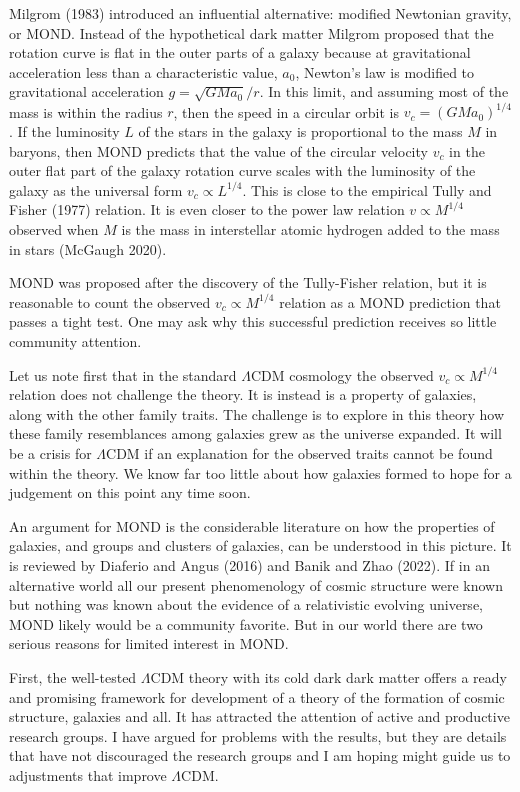 \documentclass[fleqn,usenatbib]{mnras}
\begin{document}
Milgrom (1983) introduced an influential alternative: modified Newtonian gravity, or MOND. Instead of the hypothetical dark matter Milgrom proposed that the rotation curve is flat in the outer parts of a galaxy because at gravitational acceleration less than a characteristic value, $a_0$, Newton's law is modified to gravitational acceleration $g = \sqrt{GMa_0}/r$. In this limit, and assuming most of the mass is within the radius $r$, then the speed in a circular orbit is $v_c=(GMa_0)^{1/4}$. If the luminosity $L$ of the stars in the galaxy is proportional to the mass $M$ in baryons, then MOND predicts that the value of the circular velocity $v_c$ in the outer flat part of the galaxy rotation curve scales with the luminosity of the galaxy as the universal form $v_c\propto L^{1/4}$. This is close to the empirical Tully and Fisher (1977) relation. It is even closer to the power law relation $v\propto M^{1/4}$ observed when $M$ is the mass in interstellar atomic hydrogen added to the mass in stars (McGaugh 2020). 

MOND was proposed after the discovery of the Tully-Fisher relation, but it is reasonable to count the observed $v_c\propto M^{1/4}$ relation as a MOND prediction that passes a tight test. One may ask why this successful prediction receives so little community attention.

Let us note first that in the standard $\Lambda$CDM cosmology the observed $v_c\propto M^{1/4}$ relation does not challenge the theory.  It is instead is a property of galaxies, along with the other family traits. The challenge is to explore in this theory how these family resemblances among galaxies grew as the universe expanded. It will be a crisis for $\Lambda$CDM if an explanation for the observed traits cannot be found within the theory. We know far too little about how galaxies formed to hope for a judgement on this point any time soon. 

An argument for MOND is the considerable literature on how the properties of galaxies, and groups and clusters of galaxies, can be understood in this picture. It is reviewed by Diaferio and Angus (2016) and Banik and Zhao (2022). If in an alternative world all our present  phenomenology of cosmic structure were known but nothing was known about the evidence of a relativistic evolving universe, MOND likely would be a community favorite. But in our world there are two serious reasons for limited interest in MOND.

First, the well-tested $\Lambda$CDM theory with its cold dark dark matter offers a ready and promising framework for development of a theory of the formation of cosmic structure, galaxies and all. It has attracted the attention of active and productive research groups. I have argued for problems with the results, but they are details that have not discouraged the research groups and I am hoping might guide us to adjustments that improve $\Lambda$CDM.
\end{document}
